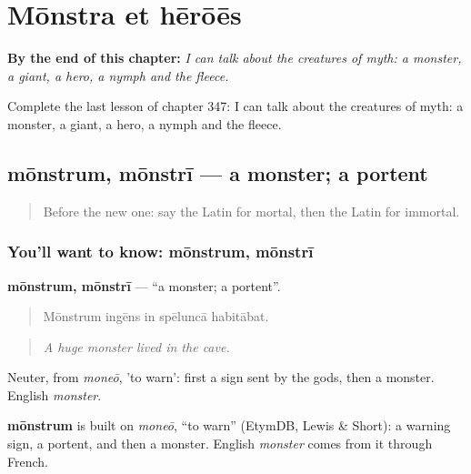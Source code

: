 
\chapter{Mōnstra et hērōēs}
\label{ch:la-monstra-et-heroes}

\begin{chapteropening}
\textbf{By the end of this chapter:} \emph{I can talk about the creatures of myth: a monster, a giant, a hero, a nymph and the fleece.}

Complete the last lesson of chapter 347: I can talk about the creatures of myth: a monster, a giant, a hero, a nymph and the fleece.
\end{chapteropening}

\section[mōnstrum, mōnstrī]{mōnstrum, mōnstrī — a monster; a portent}

\label{lesson:LA-C347-monstrum}



\begin{quote}
Before the new one: say the Latin for mortal, then the Latin for immortal.
\end{quote}

\subsection*{You'll want to know: mōnstrum, mōnstrī}
\textbf{mōnstrum, mōnstrī} — \textquotedblleft{}a monster; a portent\textquotedblright{}.

\begin{quote}
Mōnstrum ingēns in spēluncā habitābat.
\end{quote}

\begin{quote}
\emph{A huge monster lived in the cave.}
\end{quote}

Neuter, from \emph{moneō}, 'to warn': first a sign sent by the gods, then a monster. English \emph{monster}.

\begin{cousinweb}
\textbf{mōnstrum} is built on \emph{moneō}, \textquotedblleft{}to warn\textquotedblright{} (EtymDB, Lewis \& Short): a warning sign, a portent, and then a monster. English \emph{monster} comes from it through French.
\end{cousinweb}

